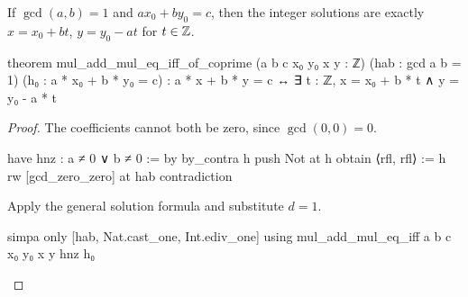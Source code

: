 \begin{corollary}
  \label{ent:cor:diophantine-coprime}
  If $\gcd(a,b)=1$ and $ax_0+by_0=c$, then the integer solutions are exactly $x=x_0+bt$,
  $y=y_0-at$ for $t\in\mathbb{Z}$.

  \begin{lean}
    theorem mul_add_mul_eq_iff_of_coprime (a b c x₀ y₀ x y : ℤ)
        (hab : gcd a b = 1) (h₀ : a * x₀ + b * y₀ = c) :
        a * x + b * y = c ↔ ∃ t : ℤ, x = x₀ + b * t ∧ y = y₀ - a * t
  \end{lean}
\end{corollary}

\begin{proof}
  The coefficients cannot both be zero, since $\gcd(0,0)=0$.

  \begin{lean}
    have hnz : a ≠ 0 ∨ b ≠ 0 := by
      by_contra h
      push Not at h
      obtain ⟨rfl, rfl⟩ := h
      rw [gcd_zero_zero] at hab
      contradiction
  \end{lean}

  Apply the general solution formula and substitute $d=1$.

  \begin{lean}
    simpa only [hab, Nat.cast_one, Int.ediv_one] using
      mul_add_mul_eq_iff a b c x₀ y₀ x y hnz h₀
  \end{lean}

\end{proof}
